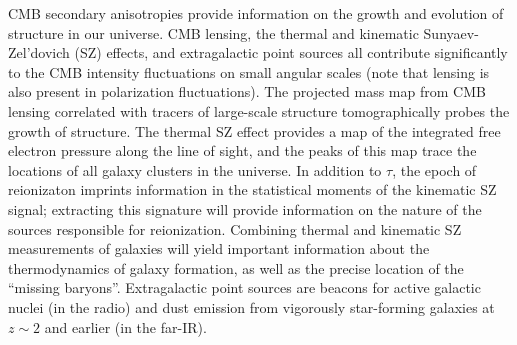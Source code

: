 \documentclass[PICOReport.tex]{subfiles}
\begin{document}
CMB secondary anisotropies provide information on the growth and evolution of structure in our universe. 
CMB lensing, the thermal and kinematic Sunyaev-Zel'dovich (SZ) effects, and extragalactic point sources all 
contribute significantly to the CMB intensity fluctuations on small angular scales (note that lensing is also 
present in polarization fluctuations). The projected mass map from CMB lensing correlated with tracers of 
large-scale structure tomographically probes the growth of structure. The thermal SZ effect provides a map of 
the integrated free electron pressure along the line of sight, and the peaks of this map trace the locations of 
all galaxy clusters in the universe. In addition to $\tau$, the epoch of reionizaton imprints information in the 
statistical moments of the kinematic SZ signal; extracting this signature will provide information on the nature 
of the sources responsible for reionization.  Combining thermal and kinematic SZ measurements of galaxies 
will yield important information about the thermodynamics of galaxy formation, as well as the precise location 
of the ``missing baryons''. Extragalactic point sources are beacons for active galactic nuclei (in the radio) and 
dust emission from vigorously star-forming galaxies at $z \sim 2$ and earlier (in the far-IR).


\end{document}

